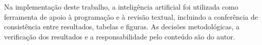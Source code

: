 Na implementação deste trabalho, a inteligência artificial foi utilizada como ferramenta de apoio à programação e à revisão textual, incluindo a conferência de consistência entre resultados, tabelas e figuras. As decisões metodológicas, a verificação dos resultados e a responsabilidade pelo conteúdo são do autor.

